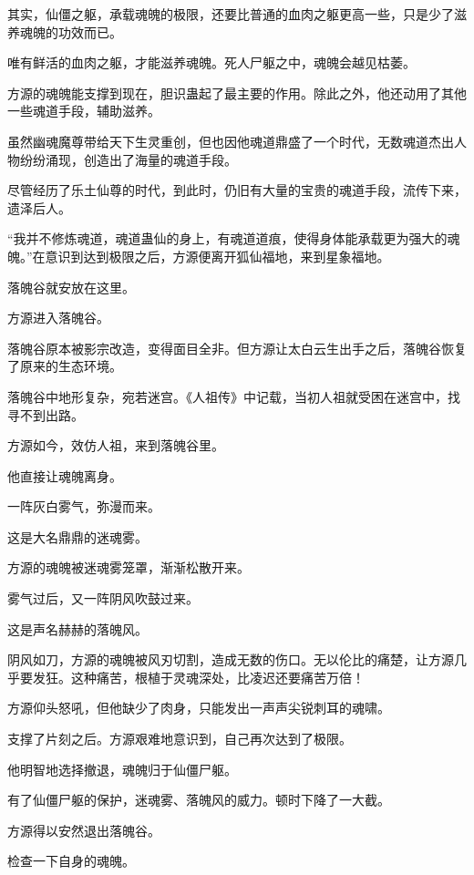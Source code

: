 
\begin{this_body}

其实，仙僵之躯，承载魂魄的极限，还要比普通的血肉之躯更高一些，只是少了滋养魂魄的功效而已。

唯有鲜活的血肉之躯，才能滋养魂魄。死人尸躯之中，魂魄会越见枯萎。

方源的魂魄能支撑到现在，胆识蛊起了最主要的作用。除此之外，他还动用了其他一些魂道手段，辅助滋养。

虽然幽魂魔尊带给天下生灵重创，但也因他魂道鼎盛了一个时代，无数魂道杰出人物纷纷涌现，创造出了海量的魂道手段。

尽管经历了乐土仙尊的时代，到此时，仍旧有大量的宝贵的魂道手段，流传下来，遗泽后人。

“我并不修炼魂道，魂道蛊仙的身上，有魂道道痕，使得身体能承载更为强大的魂魄。”在意识到达到极限之后，方源便离开狐仙福地，来到星象福地。

落魄谷就安放在这里。

方源进入落魄谷。

落魄谷原本被影宗改造，变得面目全非。但方源让太白云生出手之后，落魄谷恢复了原来的生态环境。

落魄谷中地形复杂，宛若迷宫。《人祖传》中记载，当初人祖就受困在迷宫中，找寻不到出路。

方源如今，效仿人祖，来到落魄谷里。

他直接让魂魄离身。

一阵灰白雾气，弥漫而来。

这是大名鼎鼎的迷魂雾。

方源的魂魄被迷魂雾笼罩，渐渐松散开来。

雾气过后，又一阵阴风吹鼓过来。

这是声名赫赫的落魄风。

阴风如刀，方源的魂魄被风刃切割，造成无数的伤口。无以伦比的痛楚，让方源几乎要发狂。这种痛苦，根植于灵魂深处，比凌迟还要痛苦万倍！

方源仰头怒吼，但他缺少了肉身，只能发出一声声尖锐刺耳的魂啸。

支撑了片刻之后。方源艰难地意识到，自己再次达到了极限。

他明智地选择撤退，魂魄归于仙僵尸躯。

有了仙僵尸躯的保护，迷魂雾、落魄风的威力。顿时下降了一大截。

方源得以安然退出落魄谷。

检查一下自身的魂魄。


\end{this_body}
